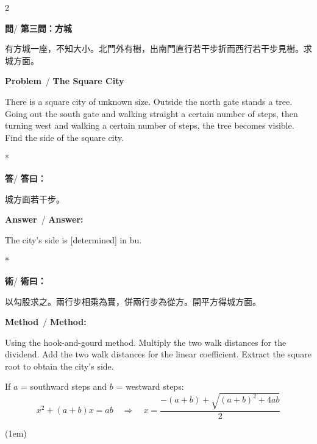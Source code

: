 \documentclass[11pt,a4paper]{article}
\newcommand{\wen}{\textbf{\color{sectioncolor}問}}
\newcommand{\da}{\textbf{\color{answercolor}答}}
\newcommand{\shu}{\textbf{\color{methodcolor}術}}
\newcommand{\prb}{\textbf{\color{sectioncolor}Problem}}
\newcommand{\ans}{\textbf{\color{answercolor}Answer}}
\newcommand{\meth}{\textbf{\color{methodcolor}Method}}
\begin{document}
\begin{paracol}{2}

\begin{leftcolumn*}
\wen / \textbf{第三問：方城}

有方城一座，不知大小。北門外有樹，出南門直行若干步折而西行若干步見樹。求城方面。
\end{leftcolumn*}

\begin{rightcolumn}
\prb\ / \textbf{The Square City}

There is a square city of unknown size. Outside the 
north gate stands a tree. Going out the south gate and walking straight 
a certain number of steps, then turning west and walking a certain 
number of steps, the tree becomes visible. Find the side of the square 
city.
\end{rightcolumn}

\switchcolumn[0]*

\begin{leftcolumn*}
\da / \textbf{答曰：}

城方面若干步。
\end{leftcolumn*}

\begin{rightcolumn}
\ans\ / \textbf{Answer:}

The city's side is [determined] in bu.
\end{rightcolumn}

\switchcolumn[0]*

\begin{leftcolumn*}
\shu / \textbf{術曰：}

以勾股求之。兩行步相乘為實，併兩行步為從方。開平方得城方面。
\end{leftcolumn*}

\begin{rightcolumn}
\meth\ / \textbf{Method:}

Using the hook-and-gourd method. Multiply the two walk 
distances for the dividend. Add the two walk distances for the linear 
coefficient. Extract the square root to obtain the city's side.

\medskip
If $a$ = southward steps and $b$ = westward steps:
\[
x^2 + (a+b)x = ab \quad\Rightarrow\quad x = \frac{-(a+b) + \sqrt{(a+b)^2 + 4ab}}{2}
\]
\end{rightcolumn}

\end{paracol}

\vspace(1em)

\end{document}
